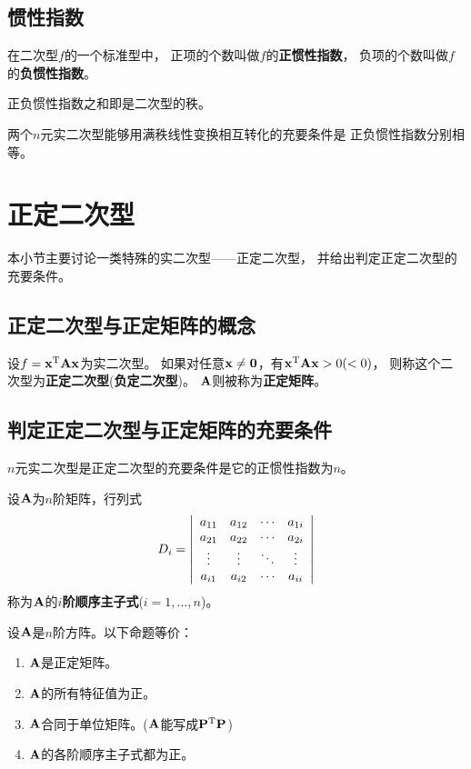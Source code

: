 \subsection{惯性指数}
\begin{definition}[正负惯性指数]
  在二次型$f$的一个标准型中，
  正项的个数叫做$f$的\textbf{正惯性指数}，
  负项的个数叫做$f$的\textbf{负惯性指数}。
\end{definition}

\begin{remark}
  正负惯性指数之和即是二次型的秩。
\end{remark}

\begin{theorem}
  两个$n$元实二次型能够用满秩线性变换相互转化的充要条件是
  正负惯性指数分别相等。
\end{theorem}

\section{正定二次型}
本小节主要讨论一类特殊的实二次型——正定二次型，
并给出判定正定二次型的充要条件。

\subsection{正定二次型与正定矩阵的概念}
\begin{definition}[正定二次型与正定矩阵]
  设$f=\mvx^\mT\mmA\mvx$为实二次型。
  如果对任意$\mvx\neq\mvZero$，有$\mvx^\mT\mmA\mvx > 0(<0)$，
  则称这个二次型为\textbf{正定二次型}(\textbf{负定二次型})。
  $\mmA$则被称为\textbf{正定矩阵}。
\end{definition}

\subsection{判定正定二次型与正定矩阵的充要条件}
\begin{theorem}[正定二次型的充要条件]
  $n$元实二次型是正定二次型的充要条件是它的正惯性指数为$n$。
\end{theorem}

\begin{definition}[顺序主子式]
  设$\mmA$为$n$阶矩阵，行列式
  \begin{displaymath}
    D_i=\mdet{cccc}{
      a_{11} & a_{12} & \cdots & a_{1i} \\
      a_{21} & a_{22} & \cdots & a_{2i} \\
      \vdots & \vdots & \ddots & \vdots \\
      a_{i1} & a_{i2} & \cdots & a_{ii} }
  \end{displaymath}
  称为$\mmA$的\textbf{$i$阶顺序主子式}($i=1,\dots,n$)。
\end{definition}

\begin{theorem}[正定矩阵的充要条件]
  设$\mmA$是$n$阶方阵。以下命题等价：
  \begin{enumerate}
    \item
    $\mmA$是正定矩阵。
    \item
    $\mmA$的所有特征值为正。
    \item
    $\mmA$合同于单位矩阵。($\mmA$能写成$\mmP^\mT\mmP$)
    \item
    $\mmA$的各阶顺序主子式都为正。
  \end{enumerate}
\end{theorem}